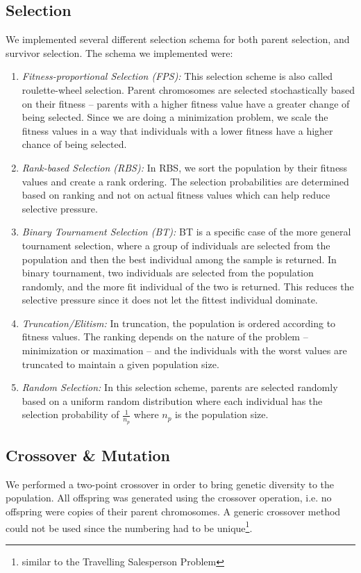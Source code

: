 \documentclass[conference,compsoc]{IEEEtran}
\begin{document}
\subsection{Selection}
We implemented several different selection schema for both parent selection, and 
survivor selection. The schema we implemented were:
\begin{enumerate}
  \item \textit{Fitness-proportional Selection (FPS):} This selection scheme 
  is also called roulette-wheel selection. Parent chromosomes are selected stochastically based on 
  their fitness -- parents with a higher fitness value have a greater change of being selected. 
  Since we are doing a minimization problem, we scale the fitness values in a way that individuals with a 
  lower fitness have a higher chance of being selected.  
  \item \textit{Rank-based Selection (RBS):} In RBS, we sort the population by their fitness values and 
  create a rank ordering. The selection probabilities are determined based on ranking and not on actual 
  fitness values which can help reduce selective pressure. 
  \item \textit{Binary Tournament Selection (BT):} BT is a specific case of the more general tournament selection, 
  where a group of individuals are selected from the population and then the best individual among the sample is returned. 
  In binary tournament, two individuals are selected from the population randomly, and the more fit individual of the two 
  is returned. This reduces the selective pressure since it does not let the fittest individual dominate. 
  \item \textit{Truncation/Elitism:} In truncation, the population is ordered according to fitness values. The ranking 
  depends on the nature of the problem -- minimization or maximation -- and the individuals with the worst values 
  are truncated to maintain a given population size. 
  \item \textit{Random Selection:} In this selection scheme, parents are selected randomly 
  based on a uniform random distribution where each individual has the selection probability of 
  $\frac{1}{n_p}$ where $n_p$ is the population size. 
\end{enumerate}


\subsection{Crossover \& Mutation}
We performed a two-point crossover in order to bring genetic diversity to the 
population. All offspring was generated using the crossover operation, i.e. no offspring 
were copies of their parent chromosomes. A generic crossover 
method could not be used since the numbering had to be unique\footnote{similar to the Travelling Salesperson Problem}.
\end{document}

